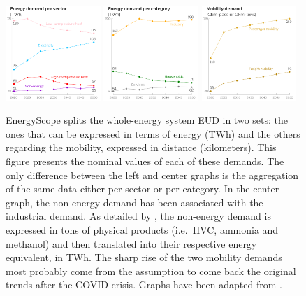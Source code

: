\documentclass[11pt,twoside,a4paper,english]{article}
\def\ie{i.e.\ }
\begin{document}
\begin{figure}[!htbp]
\centering

\includegraphics[width=0.32\textwidth]{figures/EUD_sec.pdf}
\includegraphics[width=0.32\textwidth]{figures/EUD_cat.pdf}
\includegraphics[width=0.32\textwidth]{figures/EUD_mob.pdf}
\caption{EnergyScope splits the whole-energy system \acrfull{EUD} in two sets: the ones that can be expressed in terms of energy (TWh) and the others regarding the mobility, expressed in distance (kilometers). This figure presents the nominal values of each of these demands. The only difference between the left and center graphs is the aggregation of the same data either per sector or per category. In the center graph, the non-energy demand has been associated with the industrial demand. As detailed by \citet{rixhon2022integration}, the non-energy demand is expressed in tons of physical products (\ie \acrfull{HVC}, ammonia and methanol) and then translated into their respective energy equivalent, in TWh. The sharp rise of the two mobility demands most probably come from the assumption to come back the original trends after the COVID crisis. Graphs have been adapted from \cite{limpens2023pathway}.}
\label{fig:cs_demands}
\end{figure}
\end{document}
